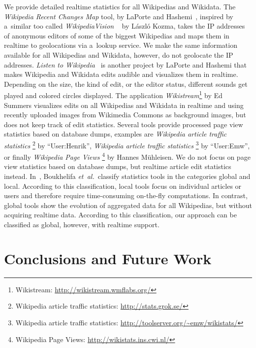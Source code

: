 \documentclass{sig-alternate}
\newcommand{\inlinelistingsize}{\fontsize{8pt}{11pt}}
\let\oldurl\url
\renewcommand{\url}[1]{\inlinelistingsize\oldurl{#1}}
\begin{document}
We provide detailed realtime statistics for all Wikipedias and Wikidata.
The \emph{Wikipedia Recent Changes Map} tool,
by LaPorte and Hashemi~\cite{laporte2013map},
inspired by a~similar too called \emph{WikipediaVision}%
~\cite{kozma2013map} by László Kozma,
takes the IP addresses of anonymous editors
of some of the biggest Wikipedias and maps them
in realtime to geolocations via a~lookup service.
We make the same information available
for all Wikipedias and Wikidata, however,
do not geolocate the IP addresses.
\emph{Listen to Wikipedia}~\cite{laporte2013listen}
is another project by
LaPorte and Hashemi that makes Wikipedia and Wikidata edits
audible and visualizes them in realtime.
Depending on the size, the kind of edit, or the editor status,
different sounds get played and colored circles displayed.
The application \emph{Wikistream}\footnote{Wikistream:
\url{http://wikistream.wmflabs.org/}} by Ed Summers
visualizes edits on all Wikipedias and Wikidata
in realtime and using recently uploaded images from Wikimedia Commons
as background images, but does not keep track of edit statistics.
Several tools provide processed page view statistics
based on database dumps, examples are
\emph{Wikipedia article traffic statistics}%
\footnote{Wikipedia article traffic statistics:
\url{http://stats.grok.se/}} by ``User:Henrik'',
\emph{Wikipedia article traffic statistics}%
\footnote{Wikipedia article traffic statistics:
\url{http://toolserver.org/~emw/wikistats/}} by ``User:Emw'',
or finally \emph{Wikipedia Page Views}%
\footnote{Wikipedia Page Views: \url{http://wikistats.ins.cwi.nl/}}
by Hannes Mühleisen.
We do not focus on page view statistics based on database dumps,
but realtime article edit statistics instead.
In~\cite{boukhelifa2010realtime}, Boukhelifa \emph{et~al.}\
classify statistics tools in the categories global and local.
According to this classification,
local tools focus on individual articles or users
and therefore require time-consuming on-the-fly computations.
In contrast,  global tools
show the evolution of aggregated data
for all Wikipedias,
but without acquiring realtime data.
According to this classification, our approach can be
classified as global, however, with realtime support.

\section{Conclusions and Future Work}



\end{document}

